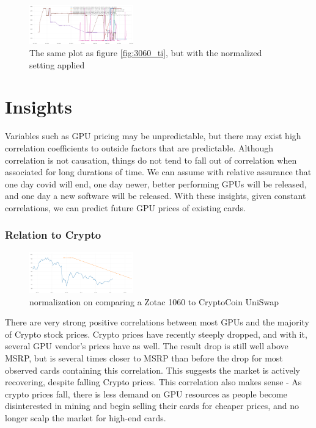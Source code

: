 \documentclass[twocolumn]{article}
\begin{document}
\begin{figure}[h]
\centering
\includegraphics[width=0.4\textwidth]{3060-ti_normalized} 
\caption{The same plot as figure \ref{fig:3060_ti}, but with the normalized setting applied}
\label{fig:3060_ti_normalized}
\end{figure}

\section{Insights}
Variables such as GPU pricing may be unpredictable, but there may exist high correlation coefficients to outside factors that are predictable. Although correlation is not causation, things do not tend to fall out of correlation when associated for long durations of time. We can assume with relative assurance that one day covid will end, one day newer, better performing GPUs will be released, and one day a new software will be released. With these insights, given constant correlations, we can predict future GPU prices of existing cards.

\subsubsection{Relation to Crypto}
\begin{figure}[h]
\centering
\includegraphics[width=0.4\textwidth]{Zotac_1060_Coin_uniswap} 
\caption{normalization on comparing a Zotac 1060 to CryptoCoin UniSwap}
\label{fig:Zotac_1060_Coin_uniswap}
\end{figure}
There are very strong positive correlations between most GPUs and the majority of Crypto stock prices. Crypto prices have recently steeply dropped, and with it, several GPU vendor's prices have as well. The result drop is still well above MSRP, but is several times closer to MSRP than before the drop for most observed cards containing this correlation. This suggests the market is actively recovering, despite falling Crypto prices. This correlation also makes sense - As crypto prices fall, there is less demand on GPU resources as people become disinterested in mining and begin selling their cards for cheaper prices, and no longer scalp the market for high-end cards.
\end{document}
